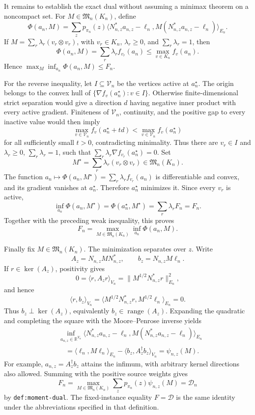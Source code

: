 It remains to establish the exact dual without assuming a minimax theorem on a noncompact set.  For \(M\in\mathfrak M_n(K_n)\), define
\[
 \Phi(a_n,M)=\sum_zp_{\pi_n}(z)
 \langle N_{n,z}^{\ast}a_{n,z}-\ell_n,
 M(N_{n,z}^{\ast}a_{n,z}-\ell_n)\rangle_{E_n}.
\]
If \(M=\sum_r\lambda_r(v_r\otimes v_r)\), with \(v_r\in K_n\), \(\lambda_r\ge0\), and \(\sum_r\lambda_r=1\), then
\[
 \Phi(a_n,M)=\sum_r\lambda_rf_{v_r}(a_n)
 \le \max_{v\in K_n}f_v(a_n).
\]
Hence \(\max_M\inf_{a_n}\Phi(a_n,M)\le F_n\).

For the reverse inequality, let \(I\subseteq\mathcal V_n\) be the vertices active at \(a_n^{\star}\).  The origin belongs to the convex hull of \(\{\nabla f_v(a_n^{\star}):v\in I\}\).  Otherwise finite-dimensional strict separation would give a direction \(d\) having negative inner product with every active gradient.  Finiteness of \(\mathcal V_n\), continuity, and the positive gap to every inactive value would then imply
\[
 \max_{v\in\mathcal V_n}f_v(a_n^{\star}+td)
 <\max_{v\in\mathcal V_n}f_v(a_n^{\star})
\]
for all sufficiently small \(t>0\), contradicting minimality.  Thus there are \(v_r\in I\) and \(\lambda_r\ge0\), \(\sum_r\lambda_r=1\), such that \(\sum_r\lambda_r\nabla f_{v_r}(a_n^{\star})=0\).  Set
\[
 M^{\star}=\sum_r\lambda_r(v_r\otimes v_r)\in\mathfrak M_n(K_n).
\]
The function \(a_n\mapsto\Phi(a_n,M^{\star})=\sum_r\lambda_rf_{v_r}(a_n)\) is differentiable and convex, and its gradient vanishes at \(a_n^{\star}\).  Therefore \(a_n^{\star}\) minimizes it.  Since every \(v_r\) is active,
\[
 \inf_{a_n}\Phi(a_n,M^{\star})
 =\Phi(a_n^{\star},M^{\star})
 =\sum_r\lambda_rF_n=F_n.
\]
Together with the preceding weak inequality, this proves
\[
 F_n=\max_{M\in\mathfrak M_n(K_n)}\inf_{a_n}\Phi(a_n,M).
\]

Finally fix \(M\in\mathfrak M_n(K_n)\).  The minimization separates over \(z\).  Write
\[
 A_z=N_{n,z}MN_{n,z}^{\ast},
 \qquad b_z=N_{n,z}M\ell_n.
\]
If \(r\in\ker(A_z)\), positivity gives
\[
 0=\langle r,A_zr\rangle_{V_n}
   =\|M^{1/2}N_{n,z}^{\ast}r\|_{E_n}^2,
\]
and hence
\[
 \langle r,b_z\rangle_{V_n}
 =\langle M^{1/2}N_{n,z}^{\ast}r,M^{1/2}\ell_n\rangle_{E_n}=0.
\]
Thus \(b_z\perp\ker(A_z)\), equivalently \(b_z\in\operatorname{range}(A_z)\).  Expanding the quadratic and completing the square with the Moore--Penrose inverse yields
\[
\begin{aligned}
 &\inf_{a_{n,z}\in\mathbb R^{V_n}}
 \langle N_{n,z}^{\ast}a_{n,z}-\ell_n,
 M(N_{n,z}^{\ast}a_{n,z}-\ell_n)\rangle_{E_n}\\
 &\quad=\langle\ell_n,M\ell_n\rangle_{E_n}
 -\langle b_z,A_z^{\dagger}b_z\rangle_{V_n}
 =\psi_{n,z}(M).
\end{aligned}
\]
For example, \(a_{n,z}=A_z^{\dagger}b_z\) attains the infimum, with arbitrary kernel directions also allowed.  Summing with the positive source weights gives
\[
 F_n=\max_{M\in\mathfrak M_n(K_n)}
       \sum_zp_{\pi_n}(z)\psi_{n,z}(M)=\mathcal D_n
\]
by \texttt{def:moment-dual}.  The fixed-instance equality \(F=\mathcal D\) is the same identity under the abbreviations specified in that definition.